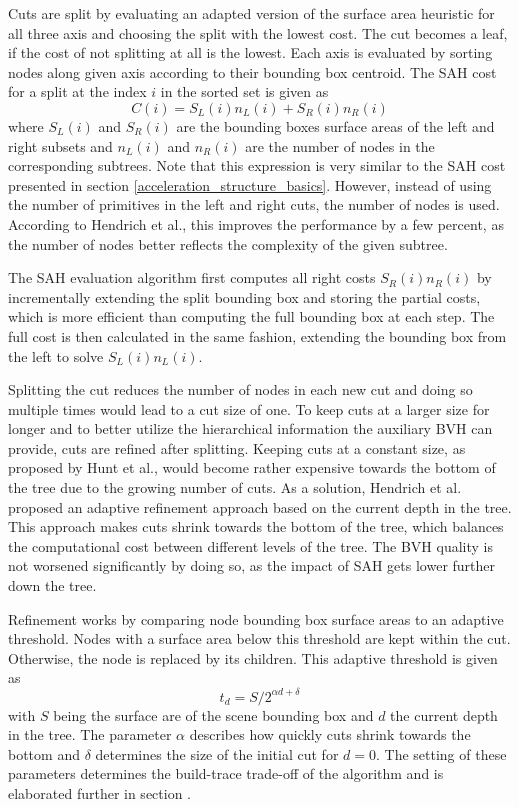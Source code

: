 Cuts are split by evaluating an adapted version of the surface area heuristic for all three axis and choosing the split with the lowest cost. The cut becomes a leaf, if the cost of not splitting at all is the lowest. Each axis is evaluated by sorting nodes along given axis according to their bounding box centroid. The SAH cost for a split at the index $i$ in the sorted set is given as 
\[C(i)=S_L(i)n_L(i)+S_R(i)n_R(i)\]
where $S_L(i)$ and $S_R(i)$ are the bounding boxes surface areas of the left and right subsets and $n_L(i)$ and $n_R(i)$ are the number of nodes in the corresponding subtrees. Note that this expression is very similar to the SAH cost presented in section \ref{acceleration_structure_basics}. However, instead of using the number of primitives in the left and right cuts, the number of nodes is used. According to Hendrich et al.\cite{hendrich_parallel_2017}, this improves the performance by a few percent, as the number of nodes better reflects the complexity of the given subtree.

The SAH evaluation algorithm first computes all right costs $S_R(i)n_R(i)$ by incrementally extending the split bounding box and storing the partial costs, which is more efficient than computing the full bounding box at each step. The full cost is then calculated in the same fashion, extending the bounding box from the left to solve $S_L(i)n_L(i)$. 

Splitting the cut reduces the number of nodes in each new cut and doing so multiple times would lead to a cut size of one. To keep cuts at a larger size for longer and to better utilize the hierarchical information the auxiliary BVH can provide, cuts are refined after splitting. Keeping cuts at a constant size, as proposed by Hunt et al.\cite{hunt07lazybuild}, would become rather expensive towards the bottom of the tree due to the growing number of cuts. As a solution, Hendrich et al.\cite{hendrich_parallel_2017} proposed an adaptive refinement approach based on the current depth in the tree. This approach makes cuts shrink towards the bottom of the tree, which balances the computational cost between different levels of the tree. The BVH quality is not worsened significantly by doing so, as the impact of SAH gets lower further down the tree. 

Refinement works by comparing node bounding box surface areas to an adaptive threshold. Nodes with a surface area below this threshold are kept within the cut. Otherwise, the node is replaced by its children. This adaptive threshold is given as 
\[t_d = S /{2^{\alpha d + \delta}}\]
with $S$ being the surface are of the scene bounding box and $d$ the current depth in the tree. The parameter $\alpha$ describes how quickly cuts shrink towards the bottom and $\delta$ determines the size of the initial cut for $d=0$. The setting of these parameters determines the build-trace trade-off of the algorithm and is elaborated further in section .

